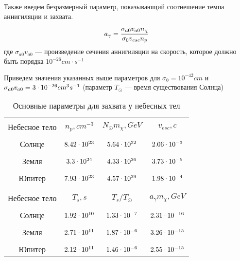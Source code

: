 Также введем безразмерный параметр, показывающий соотнешение темпа аннигиляции и захвата.
\begin{equation}
	\label{eq:a_gamma}
	a_{\gamma} = \cfrac{\sigma_{a0} v_{a0} n_{\chi}}{\sigma_{0} v_{esc} n_p}
\end{equation}
где $\sigma_{a0} v_{a0}$ --- произведение сечения аннигиляции на скорость, которое должно быть порядка $10^{-26} cm \cdot s^{-1}$

Приведем значения указанных выше параметров для $\sigma_0 = 10^{-42} cm$ и $\sigma_{a0} v_{a0} = {3}\cdot 10^{-26} cm^3 s^{-1}$ (параметр $T_{\odot}$ --- время существования Солнца)
\begin{table}[ht]
	\begin{center}
		
		\begin{tabular}{|c||c|c|c|}
			\hline &&&\\[-1em] 
			Небесное тело & $n_p, cm^{-3}$ & $N_{\odot} m_{\chi},  GeV$ & $v_{esc}, c$ \\
			\hline &&&\\[-1em] 
			Солнце & ${8.42}\cdot 10^{23}$ & ${5.64}\cdot 10^{32}$ & ${2.06}\cdot 10^{-3}$ \\
			\hline  &&&\\[-1em] 
			Земля & ${3.3}\cdot 10^{24}$ & ${4.33}\cdot 10^{26}$ & ${3.73}\cdot 10^{-5}$  \\
			\hline &&&\\[-1em] 
			Юпитер & ${7.93}\cdot 10^{23}$ & ${4.57}\cdot 10^{29}$ & ${1.98}\cdot 10^{-4}$ \\
			\hline &&&\\[-1em] 
			\hline &&&\\[-1em] 
			Небесное тело & $T_s, s$ & $T_s/T_{\odot}$ & $a_{\gamma} m_{\chi}, GeV$\\
			\hline &&&\\[-1em] 
			Солнце & ${1.92}\cdot 10^{10}$ & ${1.33}\cdot 10^{-7}$ & ${2.31}\cdot 10^{-16}$\\
			\hline &&&\\[-1em] 
			Земля & ${2.71}\cdot 10^{11}$ & ${1.87}\cdot 10^{-6}$ & ${3.26}\cdot 10^{-15}$\\
			\hline &&&\\[-1em] 
			Юпитер & ${2.12}\cdot 10^{11}$ & ${1.46}\cdot 10^{-6}$ & ${2.55}\cdot 10^{-15}$\\
			\hline
		\end{tabular}
		\caption{Основные параметры для захвата у небесных тел}
	\end{center}		
	\label{tb:Ts_number}
\end{table}

